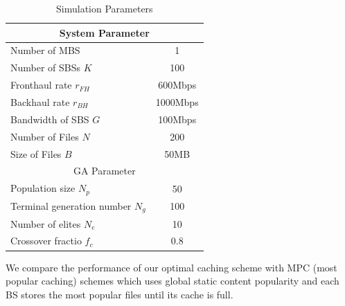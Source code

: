 \documentclass[conference]{IEEEtran}
\begin{document}
\begin{table}[htbp]
 \caption{Simulation Parameters}
 \begin{center}
  \begin{tabular}{|l|c|}
   \hline
   \multicolumn{2}{|c|}{System Parameter}                \\\hline
   Number of MBS                  & 1                 \\ \hline
   Number of SBSs $K$    & 100                \\\hline
   Fronthaul rate $r_{FH}$        & 600Mbps               \\ \hline
   Backhaul rate $r_{BH}$         & 1000Mbps               \\\hline
   Bandwidth of SBS $G$            &  100Mbps              \\\hline
   Number of Files $N$           & 200               \\\hline
   Size of Files $B$            & 50MB            \\\hline
   \multicolumn{2}{|c|}{GA Parameter}                \\\hline
   Population size $N_p$         & 50              \\\hline
   Terminal generation number $N_g$  & 100               \\\hline
   Number of elites $N_e$        & 10              \\\hline
   Crossover fractio $f_c$            & 0.8            \\\hline
  \end{tabular}
  \label{tab1}
 \end{center}
\end{table}

We compare the performance of our optimal caching scheme with MPC (most popular caching) schemes which uses global static content popularity and each BS stores the most popular files until its cache is full\cite{6600983}.
\end{document}
